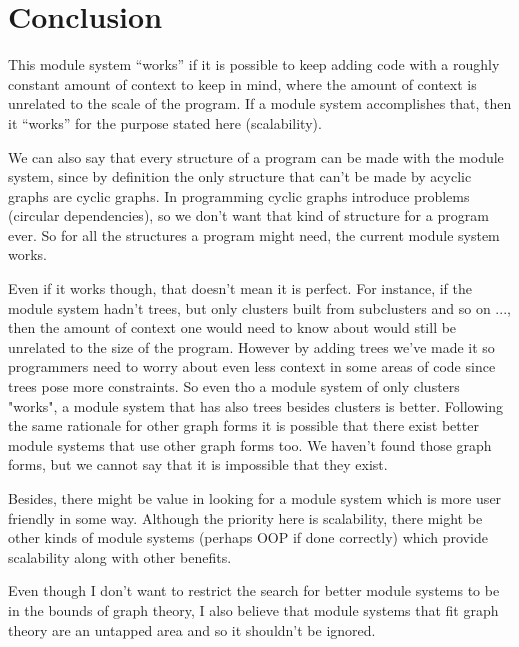 \documentclass{article}
\begin{document}

\section{Conclusion}

This module system “works” if it is possible to keep adding code with a roughly constant amount of context to keep in mind, where the amount of context is unrelated to the scale of the program. If a module system accomplishes that, then it “works” for the purpose stated here (scalability). 


We can also say that every structure of a program can be made with the module system, since by definition the only structure that can't be made by acyclic graphs are cyclic graphs. In programming cyclic graphs introduce problems (circular dependencies), so we don't want that kind of structure for a program ever. So for all the structures a program might need, the current module system works.


Even if it works though, that doesn't mean it is perfect. For instance, if the module system hadn't trees, but only clusters built from subclusters and so on ..., then the amount of context one would need to know about would still be unrelated to the size of the program. However by adding trees we've made it so programmers need to worry about even less context in some areas of code since trees pose more constraints. So even tho a module system of only clusters "works", a module system that has also trees besides clusters is better. Following the same rationale for other graph forms it is possible that there exist better module systems that use other graph forms too. We haven't found those graph forms, but we cannot say that it is impossible that they exist.


Besides, there might be value in looking for a module system which is more user friendly in some way. Although the priority here is scalability, there might be other kinds of module systems (perhaps OOP if done correctly) which provide scalability along with other benefits.

Even though I don’t want to restrict the search for better module systems to be in the bounds of graph theory, I also believe that module systems that fit graph theory are an untapped area and so it shouldn’t be ignored.
\end{document}
